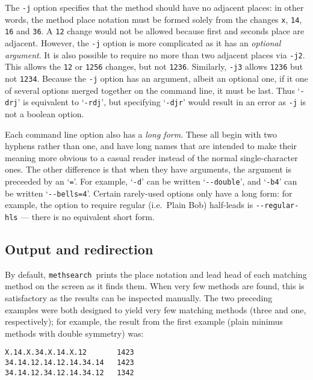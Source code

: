 \documentclass[a4paper,11pt,oneside]{book}
\makeatletter
\newcommand{\oi}[1]{\index{#1@{\hspace*{-\optwidth}\texttt{-}\texttt{#1}}}}
\def\methsearch{\texttt{meth\-search}}
\makeatother
\begin{document}
The \verb+-j+ option\oi{j} specifies that the method should have no 
adjacent places: in other words, 
the method place notation must be formed solely from 
the changes \verb+x+, \verb+14+, \verb+16+ and \verb+36+.  
A \verb+12+ change would not be allowed because first and seconds place 
are adjacent.
However, the \verb+-j+ option is more complicated as it has an 
\textit{optional argument}.  
It is also possible to require no more than 
two adjacent places via \verb+-j2+.  
This allows the \verb+12+ or \verb+1256+ changes, but not \verb+1236+.
Similarly, \verb+-j3+ allows \verb+1236+ but not \verb+1234+.  
Because the \verb+-j+ option has an argument, albeit an optional one, 
if it one of several options merged together on the command line, it 
must be last.  Thus `\verb+-drj+' is equivalent to `\verb+-rdj+', but
specifying `\verb+-djr+' would result in an error as \verb+-j+ is not
a boolean option.

Each command line option also has a 
\textit{long form}.  These all begin
with two hyphens rather than one, and have long names that are intended to 
make their meaning more obvious to a casual reader instead of the 
normal single-character ones.  The other difference is that when they
have arguments, the argument is preceeded by an `\verb+=+'.  For example,
`\verb+-d+' can be written `\verb+--double+', 
and `\verb+-b4+' can be written `\verb+--bells=4+'.  
Certain rarely-used options only have a long form: for example,
the option to require regular (i.e.\ Plain Bob) half-leads is 
\verb+--regular-hls+ --- there is no equivalent short form.


\subsection{Output and redirection}
\label{redirection}

By default, \methsearch\ prints the place notation and lead head 
of each matching method on the screen as it finds them.   When very few
methods are found, this is satisfactory as the results can be 
inspected manually.  The two preceding examples were both designed to
yield very few matching methods (three and one, respectively);
for example, the result from the first example (plain minimus methods 
with double symmetry) was:

\begin{Verbatim}
X.14.X.34.X.14.X.12       1423
34.14.12.14.12.14.34.14   1423
34.14.12.34.12.14.34.12   1342
\end{Verbatim}
\end{document}
